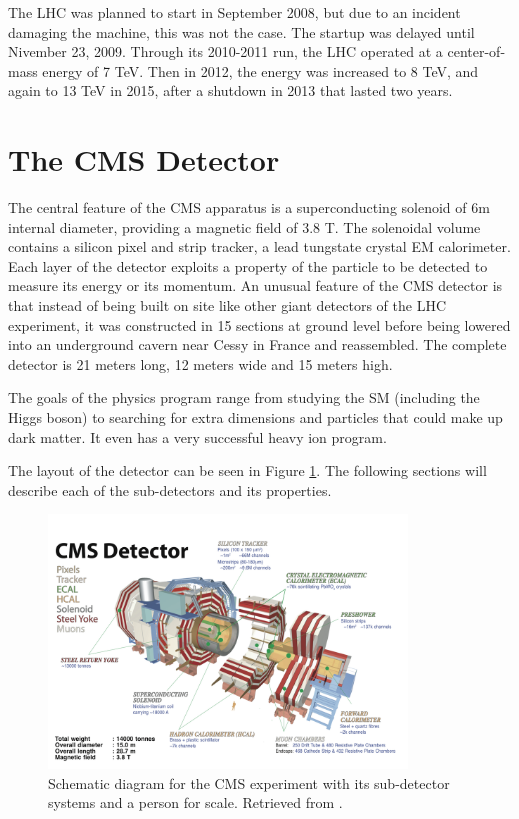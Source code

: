 The LHC was planned to start in September 2008, but due to an incident damaging the machine, this was not the case. The startup was delayed until Nivember 23, 2009. Through its 2010-2011 run, the LHC operated at a center-of-mass energy of 7 TeV. Then in 2012, the energy was increased to 8 TeV, and again to 13 TeV in 2015, after a shutdown in 2013 that lasted two years.


\section{The CMS Detector}

The central feature of the CMS apparatus is a superconducting solenoid of 6m internal diameter, providing a magnetic field of 3.8 T. The solenoidal volume contains a silicon pixel and strip tracker, a lead tungstate crystal EM calorimeter. Each layer of the detector exploits a property of the particle to be detected to measure its energy or its momentum. 
An unusual feature of the CMS detector is that instead of being built on site like other giant detectors of the LHC experiment, it was constructed in 15 sections at ground level before being lowered into an underground cavern near Cessy in France and reassembled. The complete detector is 21 meters long, 12 meters wide and 15 meters high.

The goals of the physics program range from studying the SM (including the Higgs boson) to searching for extra dimensions and particles that could make up dark matter. It even has a very successful heavy ion program.

The layout of the detector can be seen in Figure \ref{fig:cmsdia}. The following sections will describe each of the sub-detectors and its properties.

 \begin{figure}[H]
 	\centering
 	\includegraphics[width=0.85\textwidth]{figures/cms_whole.png}
 	\singlespace
 	\caption{Schematic diagram for the CMS experiment with its sub-detector systems and a person for scale. Retrieved from \cite{CMS-schematic}.}
 	\label{fig:cmsdia}
 \end{figure}

